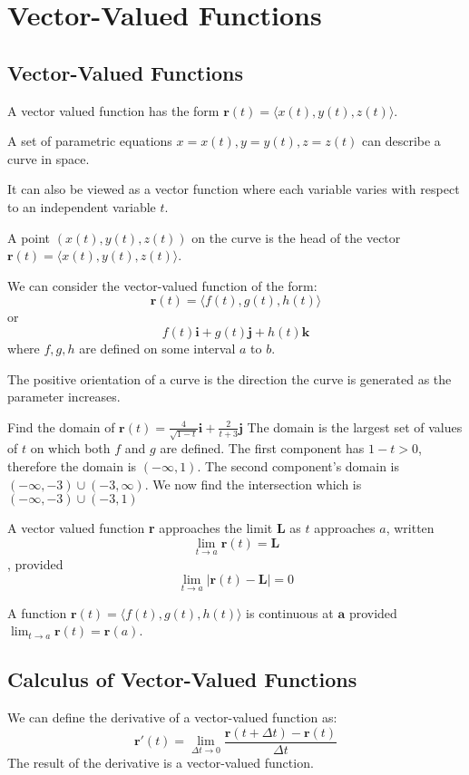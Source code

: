 \documentclass[../calc3.tex]{subfiles}
\begin{document}
\chapter{Vector-Valued Functions}
\section{Vector-Valued Functions}
A vector valued function has the form $\textbf{r}(t)=\langle x(t),y(t),z(t)\rangle$.

A set of parametric equations $x=x(t), y=y(t), z=z(t)$ can describe a curve in space.

It can also be viewed as a vector function where each variable varies with respect to an independent variable $t$. 

A point $(x(t),y(t),z(t))$ on the curve is the head of the vector $\textbf{r}(t)=\langle x(t),y(t),z(t)\rangle$.

We can consider the vector-valued function of the form: 
\[\textbf{r}(t)=\langle f(t),g(t),h(t)\rangle\]
or
\[f(t)\textbf{i}+g(t)\textbf{j}+h(t)\textbf{k}\]
where $f,g,h$ are defined on some interval $a$ to $b$.

The positive orientation of a curve is the direction the curve  is generated as the parameter increases.

\begin{example}
    Find the domain of $\textbf{r}(t)=\frac{4}{\sqrt{1-t}}\textbf{i}+\frac{2}{t+3}\textbf{j}$
    \smallbreak
    The domain is the largest set of values of $t$ on which both $f$ and $g$ are defined.
    \smallbreak
    The first component has $1-t>0$, therefore the domain is $(-\infty,1)$.
    \smallbreak
    The second component's domain is $(-\infty,-3)\cup(-3,\infty)$.
    \smallbreak
    We now find the intersection which is $(-\infty,-3)\cup(-3,1)$ 
\end{example}
\begin{definition}
    A vector valued function \textbf{r} approaches the limit \textbf{L} as $t$ approaches $a$, written \[\lim_{t\to a}\textbf{r}(t)=\textbf{L}\], provided \[\lim_{t\to a}|\textbf{r}(t)-\textbf{L}|=0\]
\end{definition}
A function $\textbf{r}(t)=\langle f(t),g(t),h(t)\rangle$ is continuous at $\textbf{a}$ provided $\lim_{t\to a}\textbf{r}(t)=\textbf{r}(a)$.
\section{Calculus of Vector-Valued Functions}
We can define the derivative of a vector-valued function as:
\[\textbf{r}'(t)=\lim_{\Delta t\to 0}\frac{\textbf{r}(t+\Delta t)-\textbf{r}(t)}{\Delta t}\]
The result of the derivative is a vector-valued function.
\end{document}
